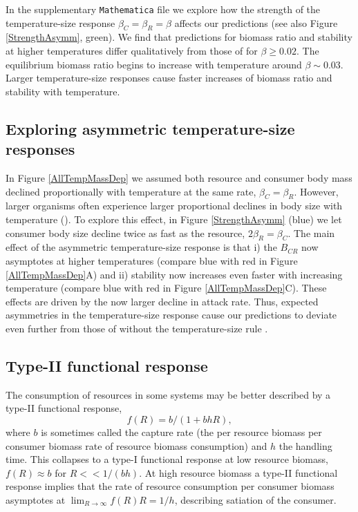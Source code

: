 \documentclass[11pt]{article}
\begin{document}
In the supplementary \texttt{Mathematica} file we explore how the strength of the temperature-size response $\beta_C = \beta_R = \beta$ affects our predictions (see also Figure \ref{StrengthAsymm}, green). 
We find that predictions for biomass ratio and stability at higher temperatures differ qualitatively from those of \cite{Gilbert2014} for $\beta\geq0.02$.
The equilibrium biomass ratio begins to increase with temperature around $\beta\sim0.03$.
Larger temperature-size responses cause faster increases of biomass ratio and stability with temperature. %

\subsection*{Exploring asymmetric temperature-size responses}

In Figure \ref{AllTempMassDep} we assumed both resource and consumer body mass declined proportionally with temperature at the same rate, $\beta_C = \beta_R$. %
However, larger organisms often experience larger proportional declines in body size with temperature (\cite{Forster2012}).
To explore this effect, in Figure \ref{StrengthAsymm} (blue) we let consumer body size decline twice as fast as the resource, $2 \beta_R = \beta_C$.
The main effect of the asymmetric temperature-size response is that i) the $B_{CR}$ now asymptotes at higher temperatures (compare blue with red in Figure \ref{AllTempMassDep}A) and ii) stability now increases even faster with increasing temperature (compare blue with red in Figure \ref{AllTempMassDep}C).
These effects are driven by the now larger decline in attack rate.
Thus, expected asymmetries in the temperature-size response cause our predictions to deviate even further from those of without the temperature-size rule \citep{Gilbert2014}.

\subsection*{Type-II functional response}

The consumption of resources in some systems may be better described by a type-II functional response, 
\[f(R) = b / (1 + b h R),\] 
where $b$ is sometimes called the capture rate (the per resource biomass per consumer biomass rate of resource biomass consumption) and $h$ the handling time.
This collapses to a type-I functional response at low resource biomass, $f(R) \approx b$ for $R << 1/(b h)$.
At high resource biomass a type-II functional response implies that the rate of resource consumption per consumer biomass asymptotes at $\lim_{R\rightarrow\infty}f(R) R = 1/h$, describing satiation of the consumer.
\end{document}
